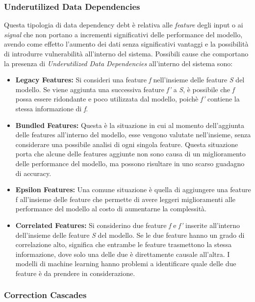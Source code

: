 \subsubsection{Underutilized Data Dependencies}
Questa tipologia di data dependency debt è relativa alle \textit{feature} degli input o ai \textit{signal} che non portano a incrementi significativi delle performance del modello, avendo come effetto l'aumento dei dati senza significativi vantaggi e la possibilità di introdurre vulnerabilità all'interno del sistema.
Possibili cause che comportano la presenza di \textit{Underutilized Data Dependencies} all'interno del sistema sono:
\begin{itemize}

\item \textbf{Legacy Features:} Si consideri una feature \textit{f} nell'insieme delle feature \textit{S} del modello. Se viene aggiunta una successiva feature \textit{f'} a \textit{S}, è possibile che \textit{f} possa essere ridondante e poco utilizzata dal modello, poichè \textit{f'} contiene la stessa informazione di \textit{f}.

\item \textbf{Bundled Features:} Questa è la situazione in cui al momento dell'aggiunta delle features all'interno del modello, esse vengono valutate nell'insieme, senza considerare una possibile analisi di ogni singola feature. Questa situazione porta che alcune delle features aggiunte non sono causa di un miglioramento delle performance del modello, ma possono risultare in uno scarso guadagno di accuracy.

\item \textbf{Epsilon Features:} Una comune situazione è quella di aggiungere una feature f all'insieme delle feature che permette di avere leggeri miglioramenti alle performance del modello al costo di aumentarne la complessità. 

\item \textbf{Correlated Features:} Si considerino due feature \textit{f} e \textit{f'} inserite all'interno dell'insieme delle feature \textit{S} del modello. Se le due feature hanno un grado di correlazione alto, significa che entrambe le feature trasmettono la stessa informazione, dove solo una delle due è direttamente causale all'altra. I modelli di machine learning hanno problemi a identificare quale delle due feature è da prendere in considerazione.
\end{itemize}

\subsubsection{Correction Cascades}

